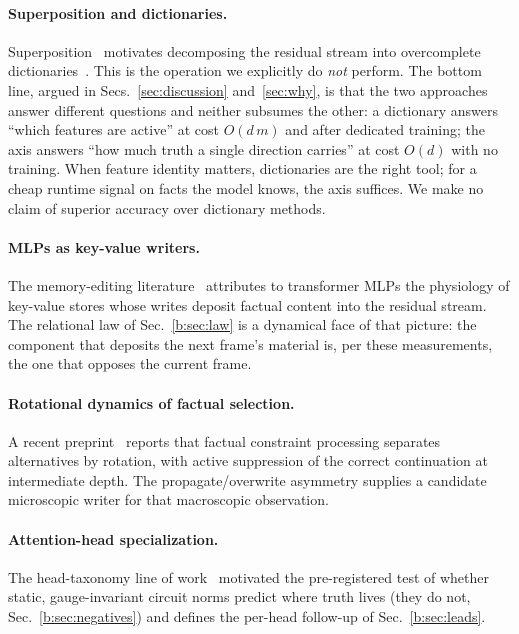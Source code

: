 \documentclass[11pt]{article}
\begin{document}
\paragraph{Superposition and dictionaries.} Superposition~\cite{elhage2022}
motivates decomposing the residual stream into overcomplete
dictionaries~\cite{cunningham2023,bricken2023}. This is the operation we
explicitly do \emph{not} perform. The bottom line, argued in
Secs.~\ref{sec:discussion} and~\ref{sec:why}, is that the two approaches
answer different questions and neither subsumes the other: a dictionary
answers ``which features are active'' at cost $O(d\,m)$ and after dedicated
training; the axis answers ``how much truth a single direction carries'' at
cost $O(d)$ with no training. When feature identity matters, dictionaries are
the right tool; for a cheap runtime signal on facts the model knows, the axis
suffices. We make no claim of superior accuracy over dictionary methods.

\paragraph{MLPs as key-value writers.} The memory-editing
literature~\cite{meng2022} attributes to transformer MLPs the physiology of
key-value stores whose writes deposit factual content into the residual
stream. The relational law of Sec.~\ref{b:sec:law} is a dynamical face of that
picture: the component that deposits the next frame's material is, per these
measurements, the one that opposes the current frame.

\paragraph{Rotational dynamics of factual selection.} A recent
preprint~\cite{rotational2026} reports that factual constraint processing
separates alternatives by rotation, with active suppression of the correct
continuation at intermediate depth. The propagate/overwrite asymmetry
supplies a candidate microscopic writer for that macroscopic observation.

\paragraph{Attention-head specialization.} The head-taxonomy line of
work~\cite{headgenome} motivated the pre-registered test of whether static,
gauge-invariant circuit norms predict where truth lives (they do not,
Sec.~\ref{b:sec:negatives}) and defines the per-head follow-up of
Sec.~\ref{b:sec:leads}.
\end{document}
